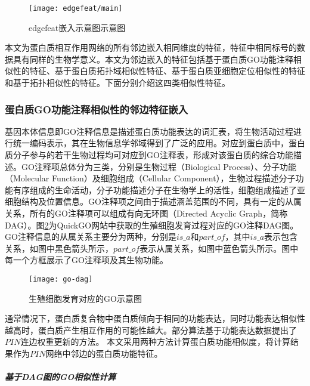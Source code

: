 \begin{figure}[htbp]
    \centering
    \texttt{[image: edgefeat/main]}
    \caption{edgefeat嵌入示意图示意图}
    \label{fig:edgefeat/main}
\end{figure}
本文为蛋白质相互作用网络的所有邻边嵌入相同维度的特征，特征中相同标号的数据具有同样的生物学意义。本文为邻边嵌入的特征包括基于蛋白质GO功能注释相似性的特征、基于蛋白质拓扑域相似性特征、基于蛋白质亚细胞定位相似性的特征和基于拓扑相似性的特征。下面分别介绍这四类相似性特征。

\subsubsection{蛋白质GO功能注释相似性的邻边特征嵌入}

基因本体信息\cite{ashburner_gene_2000}即GO注释信息是描述蛋白质功能表达的词汇表，将生物活动过程进行统一编码表示，其在生物信息学邻域得到了广泛的应用。对应到蛋白质中，蛋白质分子参与的若干生物过程均可对应到GO注释表，形成对该蛋白质的综合功能描述。GO注释项总体分为三类，分别是生物过程（Biological Process）、分子功能（Molecular Function）及细胞组成（Cellular Component），生物过程描述分子功能有序组成的生命活动，分子功能描述分子在生物学上的活性，细胞组成描述了亚细胞结构及位置信息。GO注释项之间由于描述涵盖范围的不同，具有一定的从属关系，所有的GO注释项可以组成有向无环图（Directed Acyclic Graph，简称DAG）。图\ref{fig:go-dag}为QuickGO\cite{binns_quickgo_2009}网站中获取的生殖细胞发育过程对应的GO注释DAG图。GO注释信息的从属关系主要分为两种，分别是$is\_a$和$part\_of$，其中$is\_a$表示包含关系，如图中黑色箭头所示，$part\_of$表示从属关系，如图中蓝色箭头所示。图中每一个方框展示了GO注释项及其生物功能。
\begin{figure}[htbp]
    \centering
    \texttt{[image: go-dag]}
    \caption{生殖细胞发育对应的GO示意图}
    \label{fig:go-dag}
\end{figure}

通常情况下，蛋白质复合物中蛋白质倾向于相同的功能表达，同时功能表达相似性越高时，蛋白质产生相互作用的可能性越大。部分算法\cite{ulitsky_identification_2007,jianxing_feng_max-flow-based_2011}基于功能表达数据提出了$PIN$连边权重更新的方法。
本文采用两种方法计算蛋白质功能相似度，将计算结果作为$PIN$网络中邻边的蛋白质功能特征。

\subparagraph*{基于DAG图的GO相似性计算}

